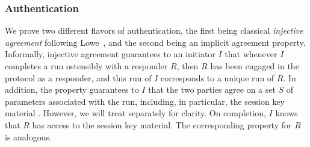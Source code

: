
\subsubsection{Authentication}
\label{sec:authenticationDef}
We prove two different flavors of authentication, the first being classical
\emph{injective agreement} following Lowe~\cite{DBLP:conf/csfw/Lowe97a}, and
the second being an implicit agreement property.
%
Informally, injective agreement guarantees to an initiator $I$ that whenever
$I$ completes a run ostensibly with a responder $R$,
then $R$ has been engaged in the protocol as a responder,
and this run of $I$ corresponds to a unique run of $R$.
%
In addition, the property guarantees to $I$ that the two parties agree on a set
$S$ of parameters associated with the run, including, in particular, the
session key material \mSessKey{}.
%
However, we will treat \mSessKey{} separately for clarity.
%
On completion, $I$ knows that $R$ has access to the session key material.
%
The corresponding property for $R$ is analogous.
%

